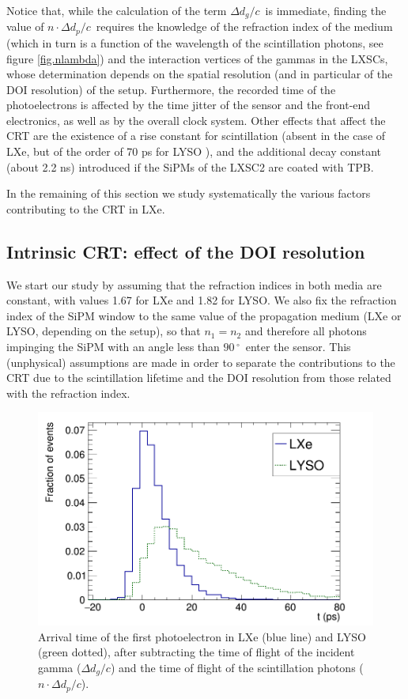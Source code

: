 \documentclass[review]{elsarticle}
\begin{document}
Notice that, while the calculation of the term $\Delta d_g/c$~is immediate, finding the value
of $n \cdot \Delta d_p/c$~requires the knowledge of the refraction index of the medium (which in turn is a function of the wavelength of the scintillation photons, see figure \ref{fig.nlambda}) and the interaction vertices of the gammas in the LXSCs, whose determination depends on the spatial resolution (and in particular of the DOI resolution) of the setup. Furthermore, the recorded time of the photoelectrons is affected by the time jitter of the sensor and the front-end electronics, as well as by the overall clock system. Other effects that affect the CRT are the existence of a rise constant for scintillation (absent in the case of LXe, but of the order of 70 ps for LYSO \cite{Seifert}), and the additional decay constant (about 2.2 ns) introduced if the SiPMs of the LXSC2 are coated with TPB. 

In the remaining of this section we study systematically the various factors contributing to the CRT in LXe. 

\subsection*{Intrinsic CRT: effect of the DOI resolution}
We start our study by assuming that the refraction indices in both media are constant, with values 1.67 for LXe and 
1.82 for LYSO. We also fix the refraction index of the SiPM window to the same value of the propagation medium (LXe or LYSO, depending on the setup), so that $n_1 = n_2$ and therefore all photons impinging the SiPM with an angle less than $90\,^{\circ}$~enter the sensor. This (unphysical) assumptions are made in order to separate the contributions to the CRT due to the scintillation lifetime and the DOI resolution from those related with the refraction index. 

\begin{figure}[!bhtp]
	\centering
	\includegraphics[scale=0.36]{../img/FirstPEScintLXeLYSO.png}
	\caption{\label{fig.firstPE} Arrival time of the first photoelectron in LXe (blue line) and LYSO (green dotted), after subtracting the time of flight of the incident gamma ($\Delta d_g/c$) and the time of flight of the scintillation photons ($n \cdot \Delta d_p/c$). }\label{fig.FirstPE}
\end{figure} 
\end{document}
